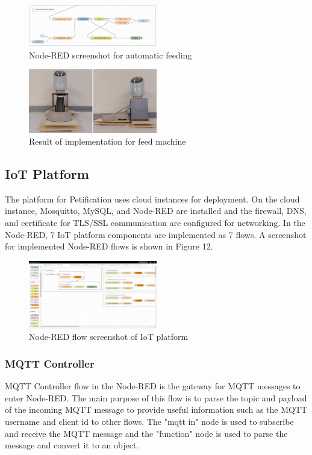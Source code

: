 ﻿\documentclass[conference]{IEEEtran}
\begin{document}
\begin{figure}[htbp]
\centerline{\includegraphics[width=0.5\textwidth]{./images/automaticFeeding.png}}
\caption{Node-RED screenshot for automatic feeding}
\label{fig}
\end{figure}

\begin{figure}[htbp]
\centerline{\includegraphics[width=0.5\textwidth]{./images/feed-machine.jpg}}
\caption{Result of implementation for feed machine}
\label{fig}
\end{figure}

\subsection{IoT Platform}
The platform for Petification uses cloud instances for deployment.
On the cloud instance, Mosquitto, MySQL, and Node-RED are installed and the firewall, DNS, and certificate for TLS/SSL communication are configured for networking.
In the Node-RED, 7 IoT platform components are implemented as 7 flows.
A screenshot for implemented Node-RED flows is shown in Figure 12.

\begin{figure}[htbp]
\centerline{\includegraphics[width=0.5\textwidth]{./images/node-red-platform-screenshot.png}}
\caption{Node-RED flow screenshot of IoT platform}
\label{fig}
\end{figure}

\subsubsection{MQTT Controller}
MQTT Controller flow in the Node-RED is the gateway for MQTT messages to enter Node-RED.
The main purpose of this flow is to parse the topic and payload of the incoming MQTT message to provide useful information such as the MQTT username and client id to other flows.
The "mqtt in" node is used to subscribe and receive the MQTT message and the "function" node is used to parse the message and convert it to an object.
\end{document}
